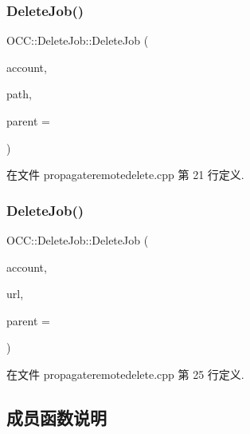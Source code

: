 \subsubsection{\texorpdfstring{Delete\+Job()}{DeleteJob()}\hspace{0.1cm}{\footnotesize\ttfamily [1/2]}}
{\footnotesize\ttfamily O\+C\+C\+::\+Delete\+Job\+::\+Delete\+Job (\begin{DoxyParamCaption}\item[{\hyperlink{namespace_o_c_c_a848616aedb9188e223c6b9867757fe69}{Account\+Ptr}}]{account,  }\item[{const Q\+String \&}]{path,  }\item[{Q\+Object $\ast$}]{parent = {} }\end{DoxyParamCaption})\hspace{0.3cm}{\ttfamily [explicit]}}



在文件 propagateremotedelete.\+cpp 第 21 行定义.

\mbox{\label{class_o_c_c_1_1_delete_job_a5bec443c978be66efb5a70230ff27daa}} 
\subsubsection{\texorpdfstring{Delete\+Job()}{DeleteJob()}\hspace{0.1cm}{\footnotesize\ttfamily [2/2]}}
{\footnotesize\ttfamily O\+C\+C\+::\+Delete\+Job\+::\+Delete\+Job (\begin{DoxyParamCaption}\item[{\hyperlink{namespace_o_c_c_a848616aedb9188e223c6b9867757fe69}{Account\+Ptr}}]{account,  }\item[{const Q\+Url \&}]{url,  }\item[{Q\+Object $\ast$}]{parent = {} }\end{DoxyParamCaption})\hspace{0.3cm}{\ttfamily [explicit]}}



在文件 propagateremotedelete.\+cpp 第 25 行定义.



\subsection{成员函数说明}
\mbox{\label{class_o_c_c_1_1_delete_job_a063e3b6e58a4cef98d25c04b532c4c33}} 
